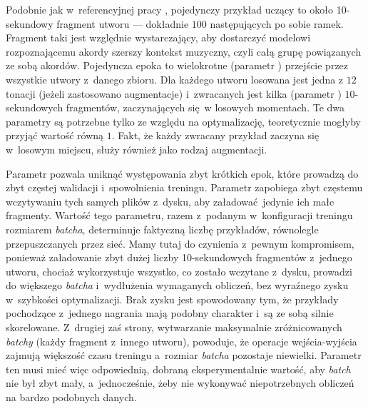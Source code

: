 Podobnie jak w~referencyjnej pracy \cite{park_bi-directional_2019}, pojedynczy przykład uczący to około 10-sekundowy fragment utworu --- dokładnie $100$ następujących po sobie ramek. Fragment taki jest względnie wystarczający, aby dostarczyć modelowi rozpoznającemu akordy szerszy kontekst muzyczny, czyli całą grupę powiązanych ze sobą akordów. Pojedyncza epoka to wielokrotne (parametr ) przejście przez wszystkie utwory z~danego zbioru. Dla każdego utworu losowana jest jedna z $12$ tonacji (jeżeli zastosowano augmentacje) i~zwracanych jest kilka (parametr ) $10$-sekundowych fragmentów, zaczynających się w losowych momentach. Te dwa parametry są potrzebne tylko ze względu na optymalizację, teoretycznie mogłyby przyjąć wartość równą $1$. Fakt, że każdy zwracany przykład zaczyna się w~losowym miejscu, służy również jako rodzaj augmentacji.

Parametr  pozwala uniknąć występowania zbyt krótkich epok, które prowadzą do zbyt częstej walidacji i~spowolnienia treningu. Parametr  zapobiega zbyt częstemu wczytywaniu tych samych plików z~dysku, aby załadować jedynie ich małe fragmenty. Wartość tego parametru, razem z~podanym w~konfiguracji treningu rozmiarem \emph{batcha}, determinuje faktyczną liczbę przykładów, równolegle przepuszczanych przez sieć. Mamy tutaj do czynienia z~pewnym kompromisem, ponieważ załadowanie zbyt dużej liczby 10-sekundowych fragmentów z~jednego utworu, chociaż wykorzystuje wszystko, co zostało wczytane z~dysku, prowadzi do większego \emph{batcha} i~wydłużenia wymaganych obliczeń, bez wyraźnego zysku w~szybkości optymalizacji. Brak zysku jest spowodowany tym, że przykłady pochodzące z~jednego nagrania mają podobny charakter i~są ze sobą silnie skorelowane. Z~drugiej zaś strony, wytwarzanie maksymalnie zróżnicowanych \emph{batchy} (każdy fragment z~innego utworu), powoduje, że operacje wejścia-wyjścia zajmują większość czasu treningu a~rozmiar \emph{batcha} pozostaje niewielki.  Parametr ten musi mieć więc odpowiednią, dobraną eksperymentalnie wartość, aby \emph{batch} nie był zbyt mały, a~jednocześnie, żeby nie wykonywać niepotrzebnych obliczeń na bardzo podobnych danych.

